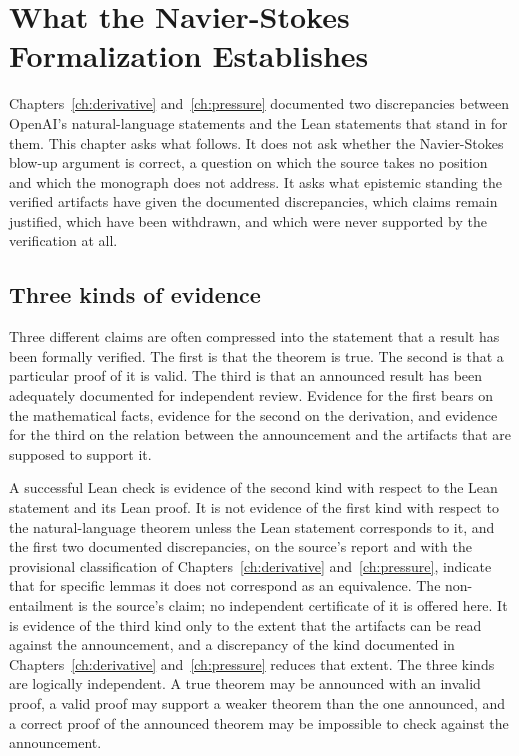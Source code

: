 \chapter{What the Navier-Stokes Formalization Establishes}
\label{ch:establishes}

Chapters~\ref{ch:derivative} and~\ref{ch:pressure} documented two discrepancies between OpenAI's natural-language statements and the Lean statements that stand in for them. This chapter asks what follows. It does not ask whether the Navier-Stokes blow-up argument is correct, a question on which the source takes no position and which the monograph does not address. It asks what epistemic standing the verified artifacts have given the documented discrepancies, which claims remain justified, which have been withdrawn, and which were never supported by the verification at all.

\section{Three kinds of evidence}

Three different claims are often compressed into the statement that a result has been formally verified. The first is that the theorem is true. The second is that a particular proof of it is valid. The third is that an announced result has been adequately documented for independent review. Evidence for the first bears on the mathematical facts, evidence for the second on the derivation, and evidence for the third on the relation between the announcement and the artifacts that are supposed to support it.

A successful Lean check is evidence of the second kind with respect to the Lean statement and its Lean proof. It is not evidence of the first kind with respect to the natural-language theorem unless the Lean statement corresponds to it, and the first two documented discrepancies, on the source's report and with the provisional classification of Chapters~\ref{ch:derivative} and~\ref{ch:pressure}, indicate that for specific lemmas it does not correspond as an equivalence. The non-entailment is the source's claim; no independent certificate of it is offered here. It is evidence of the third kind only to the extent that the artifacts can be read against the announcement, and a discrepancy of the kind documented in Chapters~\ref{ch:derivative} and~\ref{ch:pressure} reduces that extent. The three kinds are logically independent. A true theorem may be announced with an invalid proof, a valid proof may support a weaker theorem than the one announced, and a correct proof of the announced theorem may be impossible to check against the announcement.

